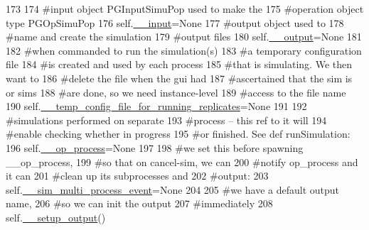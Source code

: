 \begin{DoxyCode}
173 
174         \textcolor{comment}{#input object PGInputSimuPop used to make the}
175         \textcolor{comment}{#operation object type PGOpSimuPop}
176         self.\hyperlink{classnegui_1_1pgguisimupop__experimental_1_1PGGuiSimuPop_a3a86711306a221a40328ad4587999ad8}{\_\_input}=\textcolor{keywordtype}{None}
177         \textcolor{comment}{#output object used to}
178         \textcolor{comment}{#name and create the simulation}
179         \textcolor{comment}{#output files}
180         self.\hyperlink{classnegui_1_1pgguisimupop__experimental_1_1PGGuiSimuPop_add59a4e952a1e55f018964615cf2a81f}{\_\_output}=\textcolor{keywordtype}{None}
181 
182         \textcolor{comment}{#when commanded to run the simulation(s)}
183         \textcolor{comment}{#a temporary configuration file}
184         \textcolor{comment}{#is created and used by each process}
185         \textcolor{comment}{#that is simulating.  We then want to}
186         \textcolor{comment}{#delete the file when the gui had }
187         \textcolor{comment}{#ascertained that the sim is or sims}
188         \textcolor{comment}{#are done, so we need instance-level}
189         \textcolor{comment}{#access to the file name}
190         self.\hyperlink{classnegui_1_1pgguisimupop__experimental_1_1PGGuiSimuPop_ae72b8d2d2e345c2f54623d91b786283d}{\_\_temp\_config\_file\_for\_running\_replicates}=\textcolor{keywordtype}{None}
191 
192         \textcolor{comment}{#simulations performed on separate}
193         \textcolor{comment}{#process -- this ref to it will}
194         \textcolor{comment}{#enable checking whether in progress}
195         \textcolor{comment}{#or finished.  See def runSimulation:}
196         self.\hyperlink{classnegui_1_1pgguisimupop__experimental_1_1PGGuiSimuPop_adafd48f3485d09a8cf35c6c8d8ba55ad}{\_\_op\_process}=\textcolor{keywordtype}{None}
197 
198         \textcolor{comment}{#we set this before spawning \_\_op\_process,}
199         \textcolor{comment}{#so that on cancel-sim, we can}
200         \textcolor{comment}{#notify op\_process and it can }
201         \textcolor{comment}{#clean up its subprocesses and }
202         \textcolor{comment}{#output:}
203         self.\hyperlink{classnegui_1_1pgguisimupop__experimental_1_1PGGuiSimuPop_ac9a503478329391998d8529bf5e79319}{\_\_sim\_multi\_process\_event}=\textcolor{keywordtype}{None}
204 
205         \textcolor{comment}{#we have a default output name,}
206         \textcolor{comment}{#so we can init the output}
207         \textcolor{comment}{#immediately}
208         self.\hyperlink{classnegui_1_1pgguisimupop__experimental_1_1PGGuiSimuPop_a6d2fe32b5101d7f306c2c8f1ced7f68f}{\_\_setup\_output}()

\end{DoxyCode}
